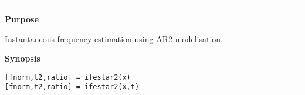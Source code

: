 

\hspace*{-1.6cm}{\Large \bf ifestar2}

\vspace*{-.4cm}
\hspace*{-1.6cm}\rule[0in]{16.5cm}{.02cm}
\vspace*{.2cm}



{\bf \large {}\selectfont Purpose}\\
\hspace*{1.5cm}
\begin{minipage}[t]{13.5cm}
Instantaneous frequency estimation using AR2 modelisation. 
\end{minipage}
\vspace*{.5cm}


{\bf \large {}\selectfont Synopsis}\\
\hspace*{1.5cm}
\begin{minipage}[t]{13.5cm}
\begin{verbatim}
[fnorm,t2,ratio] = ifestar2(x)
[fnorm,t2,ratio] = ifestar2(x,t)
\end{verbatim}
\end{minipage}
\vspace*{.5cm}


